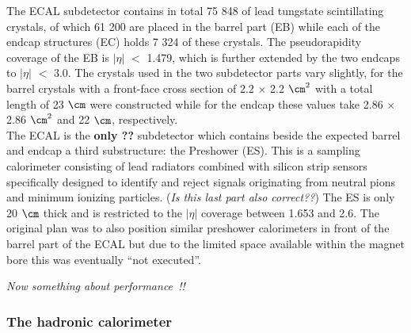 The ECAL subdetector contains in total 75 848 of lead tungstate scintillating crystals, of which 
61 200 are placed in the barrel part (EB) while each of the endcap structures (EC) holds 7 324 of these crystals.
The pseudorapidity coverage of the EB is $\vert \eta \vert$ $<$ 1.479, which is further extended by the two endcaps to $\vert \eta \vert$ $<$ 3.0. The crystals used in the two subdetector parts vary slightly, for the barrel crystals with a front-face cross section of 2.2 $\times$ 2.2 $\cm^{2}$ with a total length of 23 $\cm$ were constructed while for the endcap 
these values take 2.86 $\times$ 2.86 $\cm^{2}$ and 22 $\cm$, respectively.
\\
The ECAL is the \textbf{only ??} subdetector which contains beside the expected barrel and endcap a third substructure: the Preshower (ES). This is a sampling calorimeter consisting of lead radiators combined with silicon strip sensors specifically designed to identify and reject signals originating from neutral pions and minimum ionizing particles. (\textit{Is this last part also correct??}) The ES is only 20 $\cm$ thick and is restricted to the $\vert \eta \vert$ coverage between 1.653 and 2.6. The original plan was to also position similar preshower calorimeters in front  of the barrel part of the ECAL but due to the limited space available within the magnet bore this was eventually ``not executed''.

\textit{Now something about performance~\cite{ECALPerformance}!!}

\subsubsection{The hadronic calorimeter}

